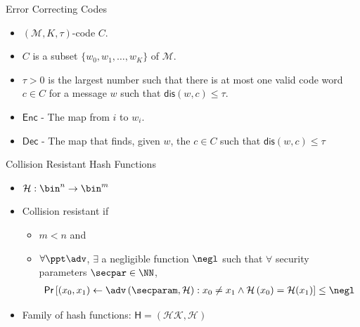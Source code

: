 \documentclass{beamer}
\newcommand{\scheme}{\mathsf{DD-Across}}
\newcommand{\msgspc}{\mathcal{M}}
\begin{document}
\begin{frame}{Error Correcting Codes}
	\begin{itemize}
		\setlength\itemsep{1em}
		\item $(\msgspc, K, \tau)$-code $C$.
		\item $C$ is a subset $\{w_0, w_1, \ldots, w_K \}$ of $\msgspc$.
		\item $\tau > 0$ is the largest number such that there is at most one valid code word $c \in C$ for a message $w$ such that $\mathsf{dis}(w,c) \leq \tau$.
		\item $\mathsf{Enc}$ - The map from $i$ to $w_i$.
		\item $\mathsf{Dec}$ - The map that finds, given $w$, the $c \in C$ such that $\mathsf{dis}(w,c) \leq \tau$\
		
	\end{itemize}
\end{frame}

\begin{frame}{Collision Resistant Hash Functions}
	\begin{itemize}
		\setlength\itemsep{1em}
		\item $\mathcal{H}: \bin^n \rightarrow \bin^m$
		\item Collision resistant if 
		 \begin{itemize}
        \item $m < n$ and
        \item $\forall \ppt \adv$, $\exists$ a negligible function $\negl$ such that $\forall$ security parameters $\secpar \in \NN$,
            \begin{multline*}
            \mathsf{Pr} \left[ ( x_0, x_1) \leftarrow \adv \left( \secparam, \mathcal{H} \right): 
x_0 \neq x_1 \wedge \mathcal{H} \left( x_0 \right) = \mathcal{H}(x_1) \right] \leq \negl
            \end{multline*}
    \end{itemize}
        \item Family of hash functions: $\mathsf{H} = ( \mathcal{HK, H} )$
	\end{itemize}
\end{frame}



\end{document}
